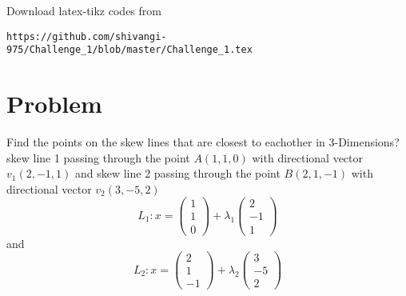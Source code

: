\documentclass[journal,12pt,twocolumn]{IEEEtran}
\begin{document}
Download latex-tikz codes from 
%
\begin{lstlisting}
https://github.com/shivangi-975/Challenge_1/blob/master/Challenge_1.tex
\end{lstlisting}
%
\section{Problem}
Find the points on the skew lines that are closest to eachother in 3-Dimensions?
 skew line 1 passing through the point \(A(1,1,0)\) with directional vector \(v_1(2,-1,1)\) and skew line 2 passing through the point \(B(2,1,-1)\)  with directional vector \(v_2(3,-5,2)\)
%
%
\begin{equation}
	L_1 : x = 
\begin{pmatrix}
	1 \\
	1 \\
	0
\end{pmatrix}
	+ \lambda_1
\begin{pmatrix}
	2 \\
	-1 \\
	1
\end{pmatrix}
	\label{eq1}
\end{equation}
and
\begin{equation}
	L_2 : x = 
\begin{pmatrix}
	2\\
	1 \\
	-1
\end{pmatrix}
	+ \lambda_2
\begin{pmatrix}
	3 \\
	-5 \\
	2
\end{pmatrix}
	\label{eq2}
\end{equation}
\end{document}

